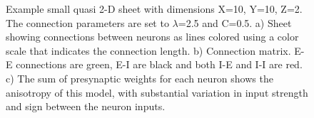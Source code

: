 \begin{figure}[!htb]
 \caption{Example small quasi 2-D sheet with dimensions X=10, Y=10, Z=2. The connection parameters are set to $\lambda$=2.5 and C=0.5. 
 a)  Sheet showing connections between neurons as lines colored using a color scale that indicates the connection length. 
 b)  Connection matrix. E-E connections are green, E-I are black and both I-E and I-I  are red. 
 c) The sum of presynaptic weights for each neuron shows the anisotropy of this model, with substantial variation in input strength and sign between the neuron inputs.}
 \label{fig:sheet_structure}
\end{figure}


